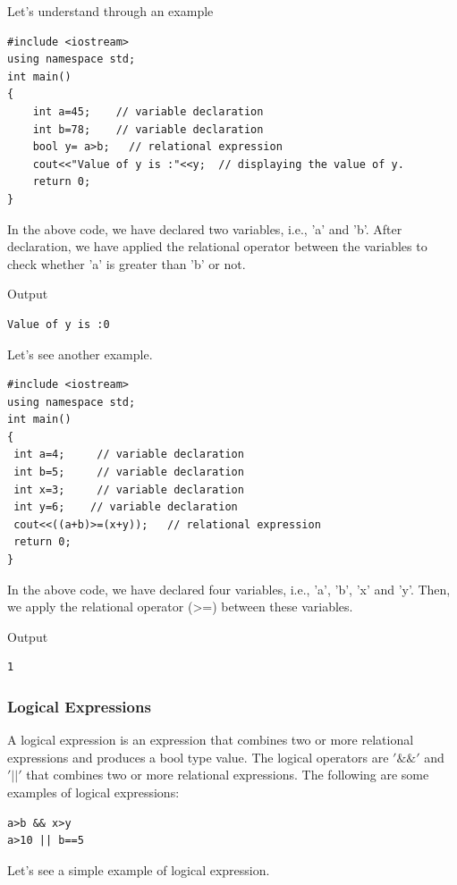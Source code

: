 \documentclass{book}
\begin{document}
Let's understand through an example

\begin{lstlisting}
#include <iostream>  
using namespace std;  
int main()  
{  
	int a=45;    // variable declaration  
	int b=78;    // variable declaration  
	bool y= a>b;   // relational expression  
	cout<<"Value of y is :"<<y;  // displaying the value of y.  
	return 0;  
}  
\end{lstlisting}

In the above code, we have declared two variables, i.e., 'a' and 'b'. After declaration, we have applied the relational operator between the variables to check whether 'a' is greater than 'b' or not.

Output

\begin{Verbatim}
Value of y is :0 
\end{Verbatim}

Let's see another example.

\begin{lstlisting}
#include <iostream>  
using namespace std;  
int main()  
{  
 int a=4;     // variable declaration  
 int b=5;     // variable declaration  
 int x=3;     // variable declaration  
 int y=6;    // variable declaration  
 cout<<((a+b)>=(x+y));   // relational expression   
 return 0;  
}  
\end{lstlisting}

In the above code, we have declared four variables, i.e., 'a', 'b', 'x' and 'y'. Then, we apply the relational operator (>=) between these variables.

Output

\begin{Verbatim}
1
\end{Verbatim} 

\subsubsection{Logical Expressions}

A logical expression is an expression that combines two or more relational expressions and produces a bool type value. The logical operators are $'\&\&'$ and $'||'$ that combines two or more relational expressions. The following are some examples of logical expressions:

\begin{Verbatim}
a>b && x>y  
a>10 || b==5  
\end{Verbatim}

Let's see a simple example of logical expression.
\end{document}
